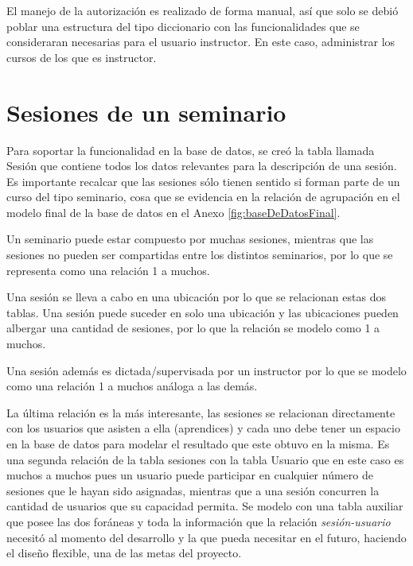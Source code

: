 	El manejo de la autorización es realizado de forma manual, así que solo se debió poblar una estructura del tipo diccionario con las funcionalidades que se consideraran necesarias para el usuario instructor. En este caso, administrar los cursos de los que es instructor.
	

	\section{Sesiones de un seminario} %
	\label{sec:sesiones_de_un_seminario}
	
	Para soportar la funcionalidad en la base de datos, se creó la tabla llamada Sesión que contiene todos los datos relevantes para la descripción de una sesión. Es importante recalcar que las sesiones sólo tienen sentido si forman parte de un curso del tipo seminario, cosa que se evidencia en la relación de agrupación en el modelo final de la base de datos en el Anexo \ref{fig:baseDeDatosFinal}. 

	Un seminario puede estar compuesto por muchas sesiones, mientras que las sesiones no pueden ser compartidas entre los distintos seminarios, por lo que se representa como una relación 1 a muchos. 

	Una sesión se lleva a cabo en una ubicación por lo que se relacionan estas dos tablas. Una sesión puede suceder en solo una ubicación y las ubicaciones pueden albergar una cantidad de sesiones, por lo que la relación se modelo como 1 a muchos.

	Una sesión además es dictada/supervisada por un instructor por lo que se modelo como una relación 1 a muchos análoga a las demás.

	La última relación es la más interesante, las sesiones se relacionan directamente con los usuarios que asisten a ella (aprendices) y cada uno debe tener un espacio en la base de datos para modelar el resultado que este obtuvo en la misma. Es una segunda relación de la tabla sesiones con la tabla Usuario que en este caso es muchos a muchos pues un usuario puede participar en cualquier número de sesiones que le hayan sido asignadas, mientras que a una sesión concurren la cantidad de usuarios que su capacidad permita. Se modelo con una tabla auxiliar que posee las dos foráneas y toda la información que la relación \emph{sesión-usuario} necesitó al momento del desarrollo y la que pueda necesitar en el futuro, haciendo el diseño flexible, una de las metas del proyecto.

